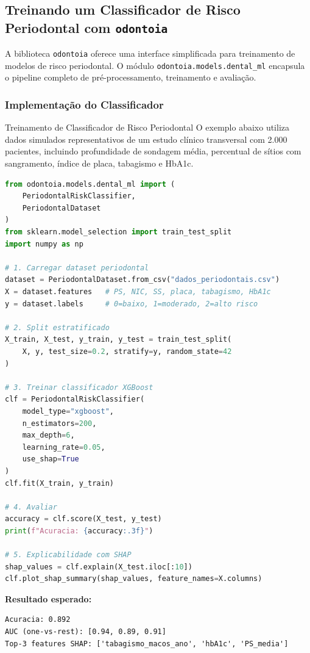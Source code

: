 \subsection{Treinando um Classificador de Risco Periodontal com \texttt{odontoia}}

A biblioteca \texttt{odontoia} oferece uma interface simplificada para treinamento de modelos de risco periodontal. O módulo \texttt{odontoia.models.dental\_ml} encapsula o pipeline completo de pré-processamento, treinamento e avaliação.

\subsubsection{Implementação do Classificador}

\begin{pratica}{Treinamento de Classificador de Risco Periodontal}
O exemplo abaixo utiliza dados simulados representativos de um estudo clínico transversal com 2.000 pacientes, incluindo profundidade de sondagem média, percentual de sítios com sangramento, índice de placa, tabagismo e HbA1c.

\begin{lstlisting}[language=Python, caption={Treinamento de classificador de risco periodontal com XGBoost}]
from odontoia.models.dental_ml import (
    PeriodontalRiskClassifier,
    PeriodontalDataset
)
from sklearn.model_selection import train_test_split
import numpy as np

# 1. Carregar dataset periodontal
dataset = PeriodontalDataset.from_csv("dados_periodontais.csv")
X = dataset.features   # PS, NIC, SS, placa, tabagismo, HbA1c
y = dataset.labels     # 0=baixo, 1=moderado, 2=alto risco

# 2. Split estratificado
X_train, X_test, y_train, y_test = train_test_split(
    X, y, test_size=0.2, stratify=y, random_state=42
)

# 3. Treinar classificador XGBoost
clf = PeriodontalRiskClassifier(
    model_type="xgboost",
    n_estimators=200,
    max_depth=6,
    learning_rate=0.05,
    use_shap=True
)
clf.fit(X_train, y_train)

# 4. Avaliar
accuracy = clf.score(X_test, y_test)
print(f"Acuracia: {accuracy:.3f}")

# 5. Explicabilidade com SHAP
shap_values = clf.explain(X_test.iloc[:10])
clf.plot_shap_summary(shap_values, feature_names=X.columns)
\end{lstlisting}

\textbf{Resultado esperado:}
\begin{lstlisting}[style=saida]
Acuracia: 0.892
AUC (one-vs-rest): [0.94, 0.89, 0.91]
Top-3 features SHAP: ['tabagismo_macos_ano', 'hbA1c', 'PS_media']
\end{lstlisting}
\end{pratica}

